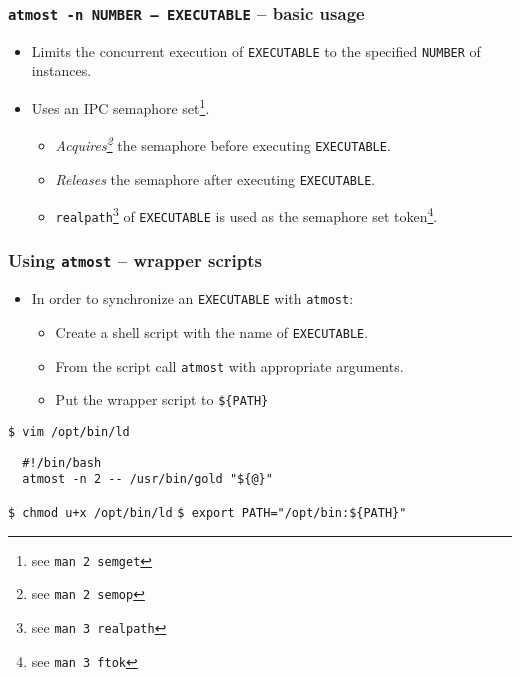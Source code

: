 \documentclass[compress,table,xcolor=table]{beamer}
\newcommand{\shelltext}[1]{\texttt{\colorbox{light-gray}{#1}}}
\begin{document}
\begin{frame}
  \frametitle{\shelltext{atmost -n NUMBER -- EXECUTABLE} -- basic usage}
  \begin{itemize}
    \Large
    \item Limits the concurrent execution of \shelltext{EXECUTABLE} to the specified \shelltext{NUMBER} of instances.
    \item Uses an IPC semaphore set\footnote{see \shelltext{man 2 semget}}.
    \begin{itemize}
      \large 
      \item {\em Acquires\footnote{see \shelltext{man 2 semop}}} the semaphore before executing \shelltext{EXECUTABLE}.
      \item {\em Releases} the semaphore after executing \shelltext{EXECUTABLE}.
      \item \shelltext{realpath}\footnote{see \shelltext{man 3 realpath}} of \shelltext{EXECUTABLE} is used as the semaphore set token\footnote{see \shelltext{man 3 ftok}}.
    \end{itemize}
  \end{itemize}
\end{frame}
\begin{frame}[fragile]
  \frametitle{Using \shelltext{atmost} -- wrapper scripts}
  \begin{itemize}
    \large
    \item In order to synchronize an \shelltext{EXECUTABLE} with \shelltext{atmost}:
    \begin{itemize}
      \item Create a shell script with the name of \shelltext{EXECUTABLE}.
      \item From the script call \shelltext{atmost} with appropriate arguments.
      \item Put the wrapper script to \shelltext{\$\{PATH\}}
    \end{itemize}
  \end{itemize}
  \shelltext{\$ vim /opt/bin/ld}
  \begin{lstlisting}
  #!/bin/bash
  atmost -n 2 -- /usr/bin/gold "${@}"
  \end{lstlisting}
  \shelltext{\$ chmod u+x /opt/bin/ld}
  \shelltext{\$ export PATH="/opt/bin:\$\{PATH\}"}\\
\end{frame}
\end{document}
